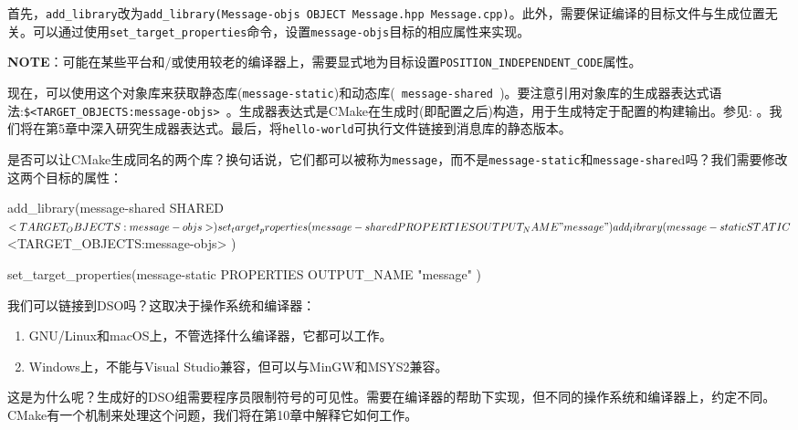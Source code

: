 首先，\texttt{add\_library}改为\texttt{add\_library(Message-objs OBJECT Message.hpp Message.cpp)}。此外，需要保证编译的目标文件与生成位置无关。可以通过使用\texttt{set\_target\_properties}命令，设置\texttt{message-objs}目标的相应属性来实现。

\begin{myInfoBox}
\textbf{NOTE}：可能在某些平台和/或使用较老的编译器上，需要显式地为目标设置\texttt{POSITION\_INDEPENDENT\_CODE}属性。
\end{myInfoBox}

现在，可以使用这个对象库来获取静态库(\texttt{message-static})和动态库(\texttt{ message-shared })。要注意引用对象库的生成器表达式语法:\texttt{\$<TARGET\_OBJECTS:message-objs> }。生成器表达式是CMake在生成时(即配置之后)构造，用于生成特定于配置的构建输出。参见:  。我们将在第5章中深入研究生成器表达式。最后，将\texttt{hello-world}可执行文件链接到消息库的静态版本。

是否可以让CMake生成同名的两个库？换句话说，它们都可以被称为\texttt{message}，而不是\texttt{message-static}和\texttt{message-share}d吗？我们需要修改这两个目标的属性：

\begin{codebox}[cmake]
add_library(message-shared
  SHARED
    $<TARGET_OBJECTS:message-objs>
    )

set_target_properties(message-shared
    PROPERTIES
        OUTPUT_NAME "message"
    )
    
add_library(message-static
    STATIC
        $<TARGET_OBJECTS:message-objs>
    )
    
set_target_properties(message-static
    PROPERTIES
        OUTPUT_NAME "message"
    )
\end{codebox}

我们可以链接到DSO吗？这取决于操作系统和编译器：

\begin{enumerate}
\item GNU/Linux和macOS上，不管选择什么编译器，它都可以工作。

\item Windows上，不能与Visual Studio兼容，但可以与MinGW和MSYS2兼容。

\end{enumerate}

这是为什么呢？生成好的DSO组需要程序员限制符号的可见性。需要在编译器的帮助下实现，但不同的操作系统和编译器上，约定不同。CMake有一个机制来处理这个问题，我们将在第10章中解释它如何工作。


